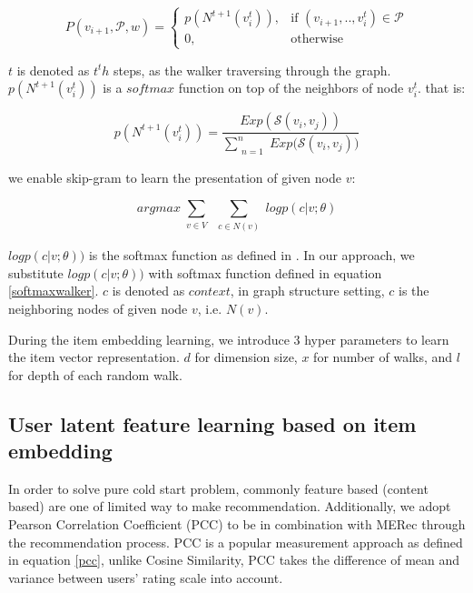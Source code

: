\begin{equation}\label{hetewalker}
    P(v_{i+1},\mathcal{P},w)= 
        \begin{cases}
            p({N^{t+1}(v_{i}^t)}),& \text{if } (v_{i+1}, .., v_{i}^t) \in \mathcal{P} \\
            0,              & \text{otherwise}
        \end{cases}
\end{equation}

$t$ is denoted as $t^th$ steps, as the walker traversing through the graph.
$p({N^{t+1}(v_{i}^t)})$ is a $softmax$ function on top of the neighbors of node $v_{i}^t$. 
that is:

\begin{equation}\label{softmaxwalker}
    p({N^{t+1}(v_{i}^t)}) = \frac{Exp(\mathcal{S}(v_i,v_j))}{\sum\limits_{\substack{n=1}}^{n} {Exp(\mathcal{S}(v_i,v_j)})}
\end{equation}

we enable skip-gram to learn the presentation of given node $v$:

\begin{equation}\label{skipgram}
    arg max
    \sum\limits_{\substack{v \in V}}
    \sum\limits_{\substack{c \in N(v)}}
    log p({c|v;\theta})
\end{equation}

$log p({c|v;\theta}))$ is the softmax function as defined in \cite{mikolov2013distributed} \cite{mikolov2013efficient}. In our approach, we substitute $log p({c|v;\theta}))$ with softmax function defined in equation \ref{softmaxwalker}. $c$ is denoted as $context$, in graph structure setting, $c$ is the neighboring nodes of given node $v$, i.e. $N(v)$. 

During the item embedding learning, we introduce 3 hyper parameters to learn the item vector representation. $d$ for dimension size, $x$ for number of walks, and $l$ for depth of each random walk.

\subsection{User latent feature learning based on item embedding}\label{3PCC}

In order to solve pure cold start problem, commonly feature based (content based) are one of limited way to make recommendation. 
Additionally, we adopt Pearson Correlation Coefficient (PCC) to be in combination with MERec through the recommendation process. 
PCC is a popular measurement approach as defined in equation \ref{pcc}, unlike Cosine Similarity, PCC takes the difference of mean and variance between users' rating scale into account.


